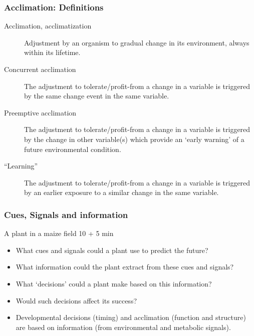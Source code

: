 \documentclass[10pt]{beamer}
\newcommand\webglyphs[1]{{\webglyphsfont\symbol{#1}}}
\newcommand\Discussion{\colorbox{white}{\textcolor{black}{\webglyphs{"F134}}}\xspace}
\begin{document}
\begin{frame}
  \frametitle{Acclimation: Definitions}
  \begin{description}
    \item[Acclimation, acclimatization] Adjustment by an organism to gradual change in its environment, always within its lifetime.
    \item[Concurrent acclimation] The adjustment to tolerate/profit-from a change in a variable is triggered by the same change event in the same variable.
    \item[Preemptive acclimation] The adjustment to tolerate/profit-from a change in a variable is triggered by the change in other variable(s) which provide an `early warning' of a future environmental condition.
    \item[``Learning''] The adjustment to tolerate/profit-from a change in a variable is triggered by an earlier exposure to a similar change in the same variable.
  \end{description}
\end{frame}

\begin{frame}
\frametitle{Cues, Signals and information \Discussion}
\begin{block}{A plant in a maize field \Discussion 10 + 5 min}
  \begin{itemize}
    \item What cues and signals could a plant use to predict the future?
    \item What information could the plant extract from these cues and signals?
    \item What `decisions' could a plant make based on this information?
    \item Would such decisions affect its success?
    \item Developmental decisions (timing) and acclimation (function and structure) are based on information (from environmental and metabolic signals).
   \end{itemize}
  \end{block}
\end{frame}
\end{document}
